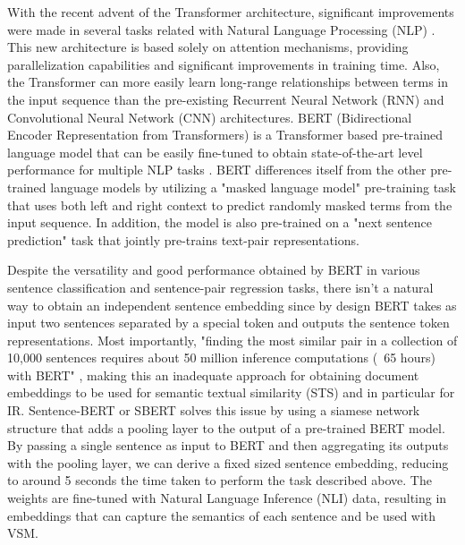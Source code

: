 \documentclass[a4paper]{article}
\begin{document}
With the recent advent of the Transformer architecture, significant improvements were made in several tasks related with Natural Language Processing (NLP) \citet{vaswani2017}. This new architecture is based solely on attention mechanisms, providing parallelization capabilities and significant improvements in training time. Also, the Transformer can more easily learn long-range relationships between terms in the input sequence than the pre-existing Recurrent Neural Network (RNN) \citep{} and Convolutional Neural Network (CNN) \citep{} architectures. BERT (Bidirectional Encoder Representation from Transformers) is a Transformer based pre-trained language model that can be easily fine-tuned to obtain state-of-the-art level performance for multiple NLP tasks \citep{devlin2019}. BERT differences itself from the other pre-trained language models by utilizing a "masked language model" pre-training task that uses both left and right context to predict randomly masked terms from the input sequence. In addition, the model is also pre-trained on a "next sentence prediction" task that jointly pre-trains text-pair representations.

Despite the versatility and good performance obtained by BERT in various sentence classification and sentence-pair regression tasks, there isn't a natural way to obtain an independent sentence embedding since by design BERT takes as input two sentences separated by a special token and outputs the sentence token representations. Most importantly, "finding the most similar pair in a collection of 10,000 sentences requires about 50 million inference computations (~65 hours) with BERT" \citep{reimers2019}, making this an inadequate approach for obtaining document embeddings to be used for semantic textual similarity (STS) and in particular for IR. Sentence-BERT or SBERT \citep{reimers2019} solves this issue by using a siamese network structure that adds a pooling layer to the output of a pre-trained BERT model. By passing a single sentence as input to BERT and then aggregating its outputs with the pooling layer, we can derive a fixed sized sentence embedding, reducing to around 5 seconds the time taken to perform the task described above. The weights are fine-tuned with Natural Language Inference (NLI) data, resulting in embeddings that can capture the semantics of each sentence and be used with VSM.

\end{document}
